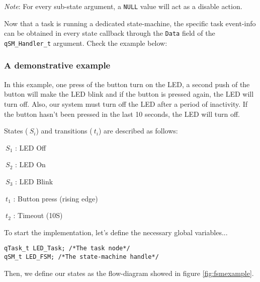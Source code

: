 \begin{tcolorbox}
\ArrowBoldDownRight \textit{Note}: For every sub-state argument, a \lstinline{NULL} value will act as a disable action.
\end{tcolorbox}

Now that a task is running a dedicated state-machine, the specific task event-info can be obtained in every state callback through the \lstinline{Data} field of the \lstinline{qSM_Handler_t} argument. Check the example below:
\medskip



\subsubsection{A demonstrative example} \label{fsm_example}
In this example, one press of the button turn on the LED, a second push of the button will make the LED blink and if the button is pressed again, the LED will turn off. Also, our system must turn off the LED after a period of inactivity. If the button hasn't been pressed in the last 10 seconds, the LED will turn off. 

States ($\ S_i$) and transitions ($\ t_i$) are described as follows: 
\medskip
\begin{itemize}
\begin{minipage}{0.4\linewidth}
    \item $\ S_1$ : LED Off
    \item $\ S_2$ : LED On
    \item $\ S_3$ : LED Blink
\end{minipage}
\begin{minipage}{0.4\linewidth}
    \item $\ t_1$ : Button press (rising edge)
    \item $\ t_2$ : Timeout (10S)
\end{minipage}
\end{itemize}



To start the implementation, let's define the necessary global variables...

\begin{lstlisting}[style=CStyle]
qTask_t LED_Task; /*The task node*/
qSM_t LED_FSM; /*The state-machine handle*/
\end{lstlisting}

Then, we define our states as the flow-diagram showed in figure \ref{fig:fsmexample}.

